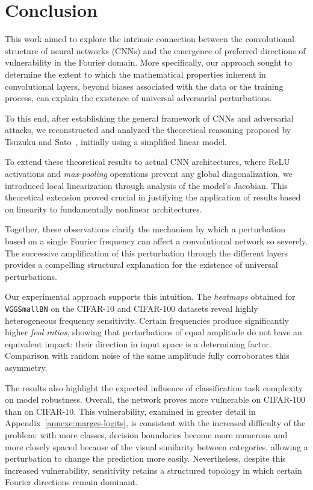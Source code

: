\chapter{Conclusion}

This work aimed to explore the intrinsic connection between the convolutional structure of neural
networks (CNNs) and the emergence of preferred directions of vulnerability in the
Fourier domain. More specifically, our approach sought to determine the extent to which the
mathematical properties inherent in convolutional layers, beyond biases associated with the data or
the training process, can explain the existence of universal adversarial perturbations.

To this end, after establishing the general framework of CNNs and adversarial attacks, we
reconstructed and analyzed the theoretical reasoning proposed by Tsuzuku and
Sato~\cite{tsuzuku2019structural}, initially using a simplified linear model.

To extend these theoretical results to actual CNN architectures, where
ReLU activations and \textit{max-pooling} operations prevent any
global diagonalization, we introduced local linearization through
analysis of the model's Jacobian. This theoretical extension proved crucial
in justifying the application of results based on linearity to
fundamentally nonlinear architectures.

Together, these observations clarify the mechanism by which a
perturbation based on a single Fourier frequency can affect a convolutional
network so severely. The successive amplification of this perturbation through
the different layers provides a compelling structural explanation for the existence of
universal perturbations.

Our experimental approach supports this intuition. The \textit{heatmaps}
obtained for \texttt{VGGSmallBN} on the CIFAR-10 and
CIFAR-100 datasets reveal highly heterogeneous frequency sensitivity.
Certain frequencies produce significantly higher \textit{fool ratios},
showing that perturbations of equal amplitude do not have an
equivalent impact: their direction in input space is a determining factor.
Comparison with random noise of the same amplitude
fully corroborates this asymmetry.

The results also highlight the expected influence of classification task
complexity on model robustness. Overall, the network proves more
vulnerable on CIFAR-100 than on CIFAR-10. This vulnerability, examined in greater detail
in Appendix~\ref{annexe:marges-logits}, is consistent with the increased difficulty of the problem:
with more classes, decision boundaries become more numerous and more closely
spaced because of the visual similarity between categories, allowing a perturbation
to change the prediction more easily. Nevertheless, despite this increased vulnerability,
sensitivity retains a structured topology in which certain Fourier directions remain dominant.

